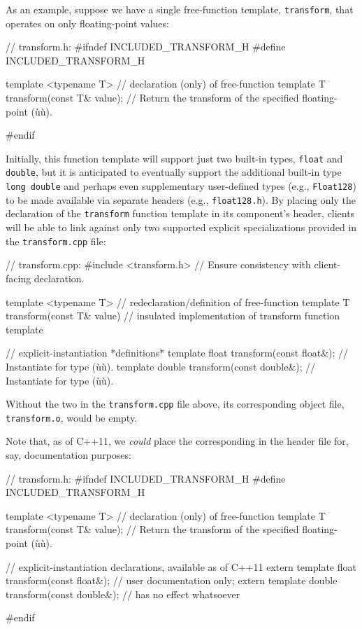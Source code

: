 As an example, suppose we have a single free-function template,
\lstinline!transform!, that operates on only floating-point values:

\begin{emcppslisting}[emcppsbatch=e6]
// transform.h:
#ifndef INCLUDED_TRANSFORM_H
#define INCLUDED_TRANSFORM_H

template <typename T>  // declaration (only) of free-function template
T transform(const T& value);
    // Return the transform of the specified floating-point (ù{}ù).

#endif
\end{emcppslisting}

\noindent Initially, this function template will support just two built-in types,
\lstinline!float! and \lstinline!double!, but it is anticipated to eventually
support the additional built-in type \lstinline!long!~\lstinline!double! and
perhaps even supplementary user-defined types (e.g., \lstinline!Float128!)
to be made available via separate headers (e.g., \lstinline!float128.h!).
By placing only the declaration of the \lstinline!transform! function
template in its component's header, clients will be able to link against
only two supported explicit specializations provided in the
\lstinline!transform.cpp! file:

\begin{emcppslisting}[emcppsbatch=e6]
// transform.cpp:
#include <transform.h>  // Ensure consistency with client-facing declaration.

template <typename T>   // redeclaration/definition of free-function template
T transform(const T& value)
{
    // insulated implementation of transform function template
}

// explicit-instantiation *definitions*
template float transform(const float&);    // Instantiate for type (ù{}ù).
template double transform(const double&);  // Instantiate for type (ù{}ù).
\end{emcppslisting}

\noindent Without the two  in
the \lstinline!transform.cpp! file above, its corresponding object file,
\lstinline!transform.o!, would be empty.

Note that, as of C++11, we \emph{could} place the corresponding
 in the header file
for, say, documentation purposes:

\begin{emcppslisting}
// transform.h:
#ifndef INCLUDED_TRANSFORM_H
#define INCLUDED_TRANSFORM_H

template <typename T>  // declaration (only) of free-function template
T transform(const T& value);
    // Return the transform of the specified floating-point (ù{}ù).

// explicit-instantiation declarations, available as of C++11
extern template float transform(const float&);    // user documentation only;
extern template double transform(const double&);  // has no effect whatsoever

#endif
\end{emcppslisting}

